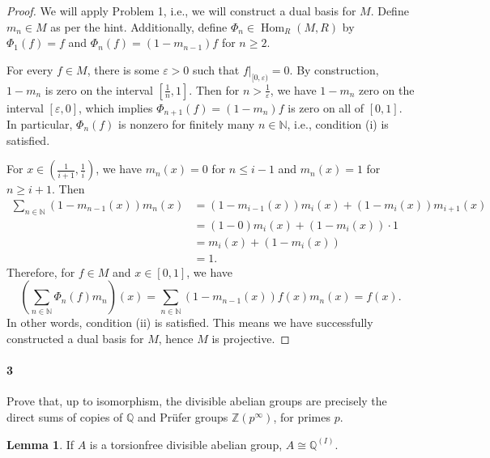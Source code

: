 \documentclass[12pt]{article}
\newlength{\myparskip}
\newenvironment{fullbox}{\begin{lrbox}{\savefullbox}\begin{minipage}{\dimexpr\textwidth-2\fboxsep\relax}\setlength{\parskip}{\myparskip}}{\end{minipage}\end{lrbox}\framebox[\textwidth]{\usebox{\savefullbox}}}
\newenvironment{pbox}[1][]{\begin{fullbox}\def\temp{#1}\ifx\temp\empty\else\paragraph{#1}\phantom{}\fi}{\end{fullbox}}
\theoremstyle{definition}
\newtheorem{lemma}{Lemma}
\newcommand{\N}{\mathbb{N}}
\newcommand{\Z}{\mathbb{Z}}
\newcommand{\Q}{\mathbb{Q}}
\newcommand{\eps}{\varepsilon}
\newcommand{\<}{\langle}
\renewcommand{\>}{\rangle}
\newcommand{\iso}{\cong}
\renewcommand{\_}[1]{{_{#1}}}
\DeclareMathOperator{\Hom}{Hom}
\begin{document}
\begin{proof}
    We will apply Problem 1, i.e., we will construct a dual basis for $M$.
    Define $m_n \in M$ as per the hint.
    Additionally, define $\Phi_n \in \Hom_R(M, R)$ by $\Phi_1(f) = f$ and $\Phi_n(f) = (1 - m_{n-1})f$ for $n \geq 2$.

    For every $f \in M$, there is some $\eps > 0$ such that $f|_{[0, \eps)} = 0$.
    By construction, $1 - m_n$ is zero on the interval $[\frac{1}{n}, 1]$.
    Then for $n > \frac{1}{\eps}$, we have $1 - m_n$ zero on the interval $[\eps, 0]$, which implies $\Phi_{n+1}(f) = (1 - m_n)f$ is zero on all of $[0, 1]$.
    In particular, $\Phi_n(f)$ is nonzero for finitely many $n \in \N$, i.e., condition (i) is satisfied.

    For $x \in (\frac{1}{i+1}, \frac{1}{i})$, we have $m_n(x) = 0$ for $n \leq i-1$ and $m_n(x) = 1$ for $n \geq i+1$.
    Then
    \begin{align*}
        \sum_{n \in \N} (1 - m_{n-1}(x))m_n(x)
            &= (1 - m_{i-1}(x))m_i(x) + (1 - m_i(x))m_{i+1}(x) \\
            &= (1 - 0)m_i(x) + (1 - m_i(x)) \cdot 1 \\
            &= m_i(x) + (1 - m_i(x)) \\
            &= 1.
    \end{align*}
    Therefore, for $f \in M$ and $x \in [0, 1]$, we have
    \[
        \left(\sum_{n \in \N} \Phi_n(f)m_n\right)(x)
            = \sum_{n \in \N} (1 - m_{n-1}(x))f(x)m_n(x)
            = f(x).
    \]
    In other words, condition (ii) is satisfied.
    This means we have successfully constructed a dual basis for $M$, hence $M$ is projective.
\end{proof}



\newpage
\begin{pbox}[3]
    Prove that, up to isomorphism, the divisible abelian groups are precisely the direct sums of copies of $\Q$ and Pr\"ufer groups $\Z(p^\infty)$, for primes $p$.
\end{pbox}

\begin{lemma}\label{lem:divab_torfree}
    If $A$ is a torsionfree divisible abelian group, $A \iso \Q^{(I)}$.
\end{lemma}
\end{document}
